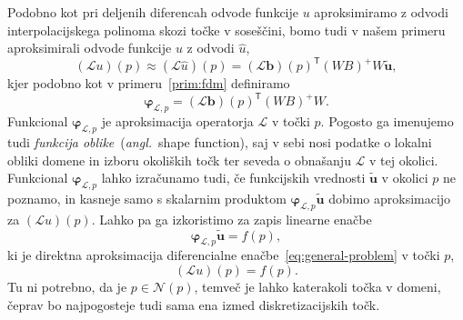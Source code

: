 \documentclass[12pt,a4paper,twoside]{article}
\theoremstyle{definition} %
\theoremstyle{plain} %
\numberwithin{equation}{section}
\newcommand{\Nc}{\mathcal{N}}
\renewcommand{\L}{\mathcal{L}}
\newcommand{\T}{\mathsf{T}}
\renewcommand{\b}{\boldsymbol}
\renewcommand{\phi}{\varphi}
\newcommand{\uh}{\hat{u}}
\newcommand{\ang}[1]{(\hspace{-1.5px}\textit{angl.}\ #1)}
\begin{document}
Podobno kot pri deljenih diferencah odvode funkcije $u$ aproksimiramo z odvodi
interpolacijskega polinoma skozi točke v soseščini, bomo tudi v našem primeru
aproksimirali odvode funkcije $u$ z odvodi $\uh$,
\begin{equation}
  (\L u)(p) \approx (\L \uh)(p) = (\L\b{b})(p)^\T(WB)^{+}W \b{\tilde{u}},
\end{equation}
kjer podobno kot v primeru~\ref{prim:fdm} definiramo
\begin{equation}
  \b\phi_{\L, p} = (\L\b{b})(p)^\T(WB)^{+}W.
  \label{eq:shape-definition}
\end{equation}
Funkcional $\b\phi_{\L, p}$ je aproksimacija operatorja $\L$ v točki $p$. Pogosto ga imenujemo
tudi \emph{funkcija oblike}~\ang{shape function}, saj v sebi nosi podatke o lokalni obliki domene in
izboru okoliških točk ter seveda o obnašanju $\L$ v tej okolici. Funkcional $\b\phi_{\L, p}$ lahko
izračunamo tudi, če funkcijskih vrednosti $\b{\tilde{u}}$ v okolici $p$ ne poznamo, in kasneje samo s
skalarnim produktom $\b\phi_{\L, p} \b{\tilde{u}}$ dobimo aproksimacijo za $(\L u)(p)$. Lahko pa ga
izkoristimo za zapis linearne enačbe
\begin{equation}
  \b\phi_{\L, p} \b{\tilde{u}} = f(p),
\end{equation}
ki je direktna aproksimacija diferencialne
enačbe~\eqref{eq:general-problem} v točki $p$,
\begin{equation}
  \label{eq:discrete-approx-in-one-point}
   (\L u)(p) = f(p).
\end{equation}
Tu ni potrebno, da je $p \in \Nc(p)$, temveč je lahko katerakoli točka v domeni, čeprav bo
najpogosteje tudi sama ena izmed diskretizacijskih točk.
\end{document}
